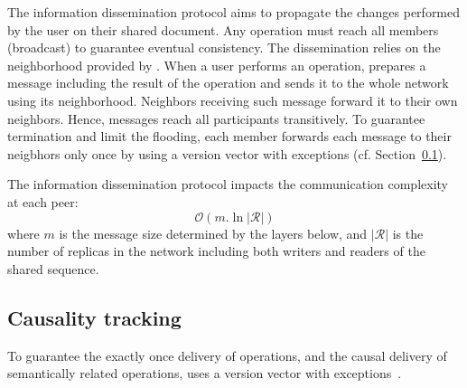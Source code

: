 \begin{asparadesc}
\item [The information dissemination protocol]\cite{birman1999bimodal} aims to
  propagate the changes performed by the user on their shared document. Any
  operation must reach all members (broadcast) to guarantee eventual
  consistency. The dissemination relies on the neighborhood provided by
  \SPRAY. When a user performs an operation, \CRATE prepares a message including
  the result of the operation and sends it to the whole network using its
  neighborhood. Neighbors receiving such message forward it to their own
  neighbors. Hence, messages reach all participants transitively. To guarantee
  termination and limit the flooding, each member forwards each message to their
  neigbhors only once by using a version vector with exceptions
  (cf. Section~\ref{subsec:causality}).

  The information dissemination protocol impacts the communication complexity at
  each peer:
  \begin{equation}
    \mathcal{O}(m.\ln |\mathcal{R}|)
  \end{equation}
  where $m$ is the message size determined by the layers below, and
  $|\mathcal{R}|$ is the number of replicas in the network including both
  writers and readers of the shared sequence.
\end{asparadesc}

\subsection{Causality tracking}
\label{subsec:causality}

To guarantee the exactly once delivery of operations, and the causal delivery of
semantically related operations, \CRATE uses a version vector with
exceptions~\cite{malkhi2007concise, mukund2014optimized}.

